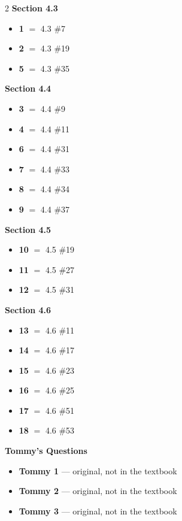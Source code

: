 \documentclass[11pt]{article}
\begin{document}
\begin{multicols}{2}
\noindent\textbf{Section 4.3}
\begin{itemize}[leftmargin=1.6em,itemsep=1pt,topsep=2pt]
  \item[] \textbf{1} $=$ 4.3 \#7
  \item[] \textbf{2} $=$ 4.3 \#19
  \item[] \textbf{5} $=$ 4.3 \#35
\end{itemize}

\smallskip
\noindent\textbf{Section 4.4}
\begin{itemize}[leftmargin=1.6em,itemsep=1pt,topsep=2pt]
  \item[] \textbf{3} $=$ 4.4 \#9
  \item[] \textbf{4} $=$ 4.4 \#11
  \item[] \textbf{6} $=$ 4.4 \#31
  \item[] \textbf{7} $=$ 4.4 \#33
  \item[] \textbf{8} $=$ 4.4 \#34
  \item[] \textbf{9} $=$ 4.4 \#37
\end{itemize}

\smallskip
\noindent\textbf{Section 4.5}
\begin{itemize}[leftmargin=1.6em,itemsep=1pt,topsep=2pt]
  \item[] \textbf{10} $=$ 4.5 \#19
  \item[] \textbf{11} $=$ 4.5 \#27
  \item[] \textbf{12} $=$ 4.5 \#31
\end{itemize}

\smallskip
\noindent\textbf{Section 4.6}
\begin{itemize}[leftmargin=1.6em,itemsep=1pt,topsep=2pt]
  \item[] \textbf{13} $=$ 4.6 \#11
  \item[] \textbf{14} $=$ 4.6 \#17
  \item[] \textbf{15} $=$ 4.6 \#23
  \item[] \textbf{16} $=$ 4.6 \#25
  \item[] \textbf{17} $=$ 4.6 \#51
  \item[] \textbf{18} $=$ 4.6 \#53
\end{itemize}

\smallskip
\noindent\textbf{Tommy's Questions}
\begin{itemize}[leftmargin=1.6em,itemsep=1pt,topsep=2pt]
  \item[] \textbf{Tommy 1} --- original, not in the textbook
  \item[] \textbf{Tommy 2} --- original, not in the textbook
  \item[] \textbf{Tommy 3} --- original, not in the textbook
\end{itemize}
\end{multicols}
\end{document}
